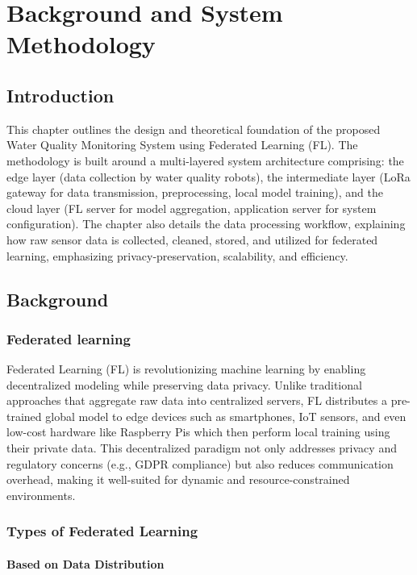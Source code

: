 \chapter{Background and System Methodology}
\label{chap:Chapter 3 title}
\section*{Introduction}
This chapter outlines the design and theoretical foundation of the proposed Water Quality Monitoring System using Federated Learning (FL). The methodology is built around a multi-layered system architecture comprising: the edge layer (data collection by water quality robots), the intermediate layer (LoRa gateway for data transmission, preprocessing, local model training), and the cloud layer (FL server for model aggregation, application server for system configuration). The chapter also details the data processing workflow, explaining how raw sensor data is collected, cleaned, stored, and utilized for federated learning, emphasizing privacy-preservation, scalability, and efficiency.


\newpage
\section{Background }
\subsection{Federated learning}

Federated Learning (FL) is revolutionizing machine learning by enabling decentralized modeling while preserving data privacy. Unlike traditional approaches that aggregate raw data into centralized servers, FL distributes a pre-trained global model to edge devices  such as smartphones, IoT sensors, and even low-cost hardware like Raspberry Pis  which then perform local training using their private data. This decentralized paradigm not only addresses privacy and regulatory concerns (e.g., GDPR compliance) but also reduces communication overhead, making it well-suited for dynamic and resource-constrained environments.


\subsection{Types of Federated Learning}
\subsubsection{Based on Data Distribution}

